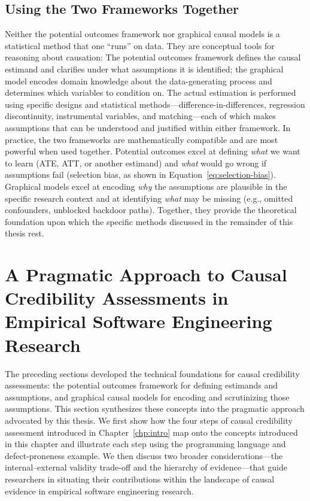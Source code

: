 \subsection{Using the Two Frameworks Together}

Neither the potential outcomes framework nor graphical causal models is a statistical method that one ``runs'' on data.
They are conceptual tools for reasoning about causation: The potential outcomes framework defines the causal estimand and clarifies under what assumptions it is identified; the graphical model encodes domain knowledge about the data-generating process and determines which variables to condition on.
The actual estimation is performed using specific designs and statistical methods---difference-in-differences, regression discontinuity, instrumental variables, and matching---each of which makes assumptions that can be understood and justified within either framework.
In practice, the two frameworks are mathematically compatible and are most powerful when used together.
Potential outcomes excel at defining \emph{what} we want to learn (ATE, ATT, or another estimand) and \emph{what} would go wrong if assumptions fail (selection bias, as shown in Equation~\eqref{eq:selection-bias}).
Graphical models excel at encoding \emph{why} the assumptions are plausible in the specific research context and at identifying \emph{what} may be missing (e.g., omitted confounders, unblocked backdoor paths).
Together, they provide the theoretical foundation upon which the specific methods discussed in the remainder of this thesis rest.

\section{A Pragmatic Approach to Causal Credibility Assessments in Empirical Software Engineering Research}
\label{sec:pragmatic}

The preceding sections developed the technical foundations for causal credibility assessments: the potential outcomes framework for defining estimands and assumptions, and graphical causal models for encoding and scrutinizing those assumptions. %
This section synthesizes these concepts into the pragmatic approach advocated by this thesis.
We first show how the four steps of causal credibility assessment introduced in Chapter~\ref{chp:intro} map onto the concepts introduced in this chapter and illustrate each step using the programming language and defect-proneness example.
We then discuss two broader considerations---the internal--external validity trade-off and the hierarchy of evidence---that guide researchers in situating their contributions within the landscape of causal evidence in empirical software engineering research.

